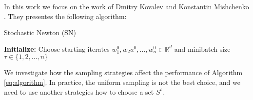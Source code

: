 \documentclass{article}
\begin{document}
In this work we focus on the work of Dmitry Kovalev and Konstantin Mishchenko \cite{litlink4}. They presentes the following algorithm:

\begin{algorithm}\label{eq:algorithm}
\caption{Stochastic Newton (SN)}\label{alg:cap}
\begin{algorithmic}
\State \textbf{Initialize:} Choose starting iterates $w_1^0, w_2a^0, \dots, w_n^0 \in \mathbb{R}^d$ and minibatch size $\tau \in \{1, 2, \dots, n\}$
 \Do
 
\EndFor
\end{algorithmic}
\end{algorithm}





We investigate how the sampling strategies affect the performance of Algorithm \eqref{eq:algorithm}. In practice, the uniform sampling is not the best choice, and we need to use another strategies how to choose a set $S^t$. 
\end{document}
